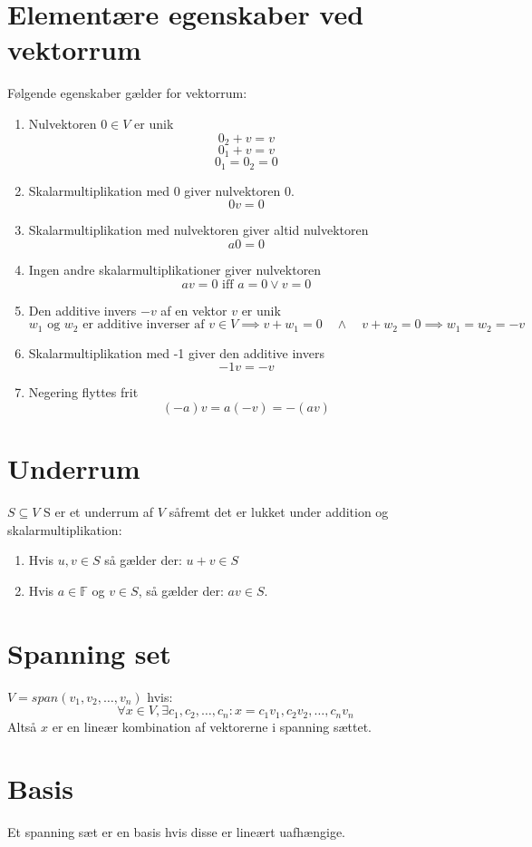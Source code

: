 \documentclass[a4paper,oneside,article]{memoir}
\begin{document}
    \section{Elementære egenskaber ved vektorrum}
    Følgende egenskaber gælder for vektorrum:
    \begin{enumerate}
    \item Nulvektoren $0\in V$ er unik
    $$0_2+v=v$$
    $$0_1+v=v$$
    $$0_1=0_2=0$$
    \item Skalarmultiplikation med 0 giver nulvektoren 0.
    $$0v=0$$
    \item Skalarmultiplikation med nulvektoren giver altid nulvektoren
    $$a0=0$$
    \item Ingen andre skalarmultiplikationer giver nulvektoren
    $$av=0\text{ iff } a=0 \vee v=0$$
    \item Den additive invers $-v$ af en vektor $v$ er unik
    $$w_1 \text{ og } w_2 \text{ er additive inverser af } v \in V \implies v+w_1 =0 \quad \wedge \quad v+w_2=0 \implies w_1=w_2=-v$$
    \item Skalarmultiplikation med -1 giver den additive invers
    $$-1v = -v$$
    \item Negering flyttes frit
    $$(-a)v=a(-v)=-(av)$$
    \end{enumerate}
    
    \section{Underrum}
    $S \subseteq V$ S er et underrum af $V$ såfremt det er lukket under addition og skalarmultiplikation:
    
    \begin{enumerate}
    \item Hvis $u,v\in S$ så gælder der: $u+v\in S$
    \item Hvis $a\in \mathbb{F}$ og $v \in S$, så gælder der: $av\in S$.
    \end{enumerate}
    
    \section{Spanning set}
    $V=span(v_1,v_2,\dots, v_n)$ hvis: $$\forall x \in V, \exists c_1, c_2, \dots, c_n: x=c_1v_1,c_2v_2,\dots,c_nv_n$$
    Altså $x$ er en lineær kombination af vektorerne i spanning sættet.
    
    \section{Basis}
    Et spanning sæt er en basis hvis disse er lineært uafhængige.
    
\end{document}
